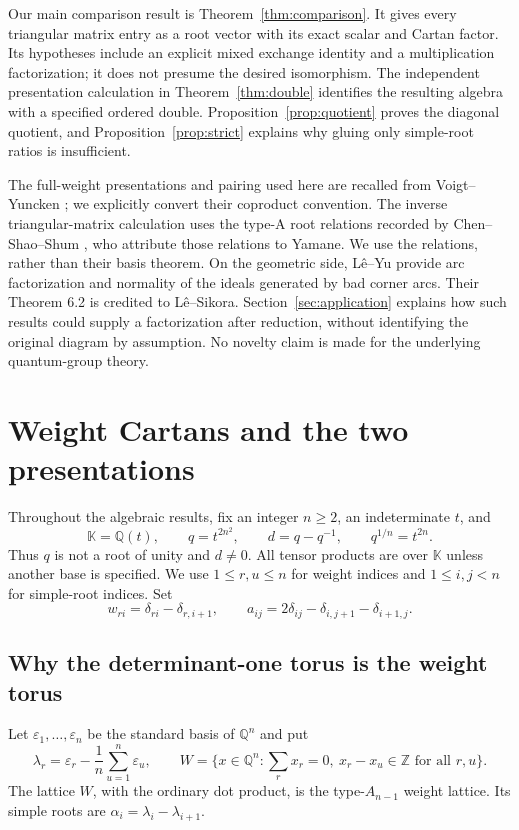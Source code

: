 \documentclass[11pt]{article}
\theoremstyle{definition}
\theoremstyle{remark}
\newcommand{\kk}{\mathbb{K}}
\newcommand{\Z}{\mathbb{Z}}
\newcommand{\Q}{\mathbb{Q}}
\newcommand{\eps}{\varepsilon}
\begin{document}
Our main comparison result is Theorem~\ref{thm:comparison}. It gives every triangular matrix entry as a root vector with its exact scalar and Cartan factor. Its hypotheses include an explicit mixed exchange identity and a multiplication factorization; it does not presume the desired isomorphism. The independent presentation calculation in Theorem~\ref{thm:double} identifies the resulting algebra with a specified ordered double. Proposition~\ref{prop:quotient} proves the diagonal quotient, and Proposition~\ref{prop:strict} explains why gluing only simple-root ratios is insufficient.

The full-weight presentations and pairing used here are recalled from Voigt--Yuncken \cite[Definition 2.13, Proposition 2.14, and Section 2.8.1]{VY}; we explicitly convert their coproduct convention. The inverse triangular-matrix calculation uses the type-A root relations recorded by Chen--Shao--Shum \cite[Section 3]{CSS}, who attribute those relations to Yamane. We use the relations, rather than their basis theorem. On the geometric side, L\^e--Yu \cite[Theorems 6.2 and 7.2]{LY} provide arc factorization and normality of the ideals generated by bad corner arcs. Their Theorem 6.2 is credited to L\^e--Sikora.  Section~\ref{sec:application} explains how such results could supply a factorization after reduction, without identifying the original diagram by assumption. No novelty claim is made for the underlying quantum-group theory.

\section{Weight Cartans and the two presentations}\label{sec:presentations}

Throughout the algebraic results, fix an integer $n\geq2$, an indeterminate $t$, and
\begin{equation}\label{eq:base}
 \kk=\Q(t),\qquad q=t^{2n^2},\qquad d=q-q^{-1},\qquad q^{1/n}=t^{2n}.
\end{equation}
Thus $q$ is not a root of unity and $d\ne0$. All tensor products are over $\kk$ unless another base is specified. We use $1\leq r,u\leq n$ for weight indices and $1\leq i,j<n$ for simple-root indices. Set
\[
 w_{ri}=\delta_{ri}-\delta_{r,i+1},\qquad
 a_{ij}=2\delta_{ij}-\delta_{i,j+1}-\delta_{i+1,j}.
\]

\subsection{Why the determinant-one torus is the weight torus}
Let $\eps_1,\ldots,\eps_n$ be the standard basis of $\Q^n$ and put
\[
 \lambda_r=\eps_r-\frac1n\sum_{u=1}^n\eps_u,\qquad
 W=\{x\in\Q^n:\textstyle\sum_r x_r=0,\ x_r-x_u\in\Z\text{ for all }r,u\}.
\]
The lattice $W$, with the ordinary dot product, is the type-$A_{n-1}$ weight lattice. Its simple roots are $\alpha_i=\lambda_i-\lambda_{i+1}$.
\end{document}
